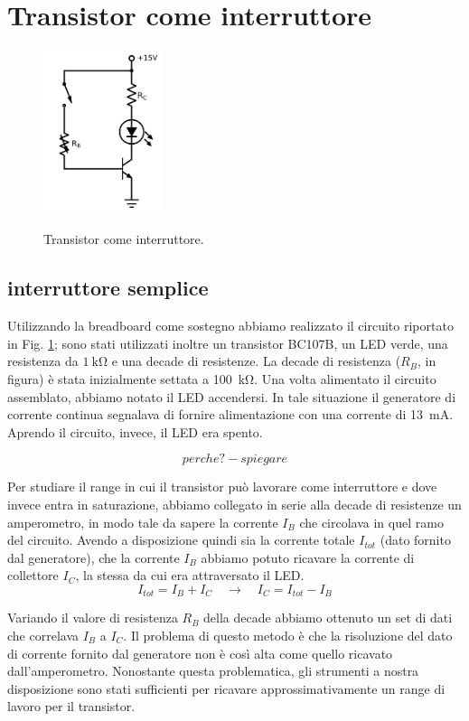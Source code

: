 \section{Transistor come interruttore}

\begin{figure}
	\caption{Transistor come interruttore.}
	\includegraphics[width=35mm]{cc1.pdf}
	\label{fig:cc1}
\end{figure}

\subsection{interruttore semplice}
Utilizzando la breadboard come sostegno abbiamo realizzato il circuito riportato in Fig. \ref{fig:cc1}; sono stati utilizzati inoltre un transistor BC107B, un LED verde, una resistenza da $\SI{1}{\kilo\ohm}$ e una decade di resistenze. La decade di resistenza ($R_B$, in figura) è stata inizialmente settata a \SI{100}{\kilo\ohm}.
Una volta alimentato il circuito assemblato, abbiamo notato il LED accendersi. In tale situazione il generatore di corrente continua segnalava di fornire alimentazione con una corrente di \SI{13}{\milli\ampere}. Aprendo il circuito, invece, il LED era spento.

$$perche? - spiegare$$

Per studiare il range in cui il transistor può lavorare come interruttore e dove invece entra in saturazione, abbiamo collegato in serie alla decade di resistenze un amperometro, in modo tale da sapere la corrente $I_B$ che circolava in quel ramo del circuito. Avendo a disposizione quindi sia la corrente totale $I_{tot}$ (dato fornito dal generatore), che la corrente $I_B$ abbiamo potuto ricavare la corrente di collettore $I_C$, la stessa da cui era attraversato il LED.
\begin{equation*}
	I_{tot} = I_B + I_C \quad \rightarrow \quad I_C = I_{tot} - I_B
\end{equation*}

Variando il valore di resistenza $R_B$ della decade abbiamo ottenuto un set di dati che correlava $I_B$ a $I_C$. Il problema di questo metodo è che la risoluzione del dato di corrente fornito dal generatore non è così alta come quello ricavato dall'amperometro. Nonostante questa problematica, gli strumenti a nostra disposizione sono stati sufficienti per ricavare approssimativamente un range di lavoro per il transistor.

